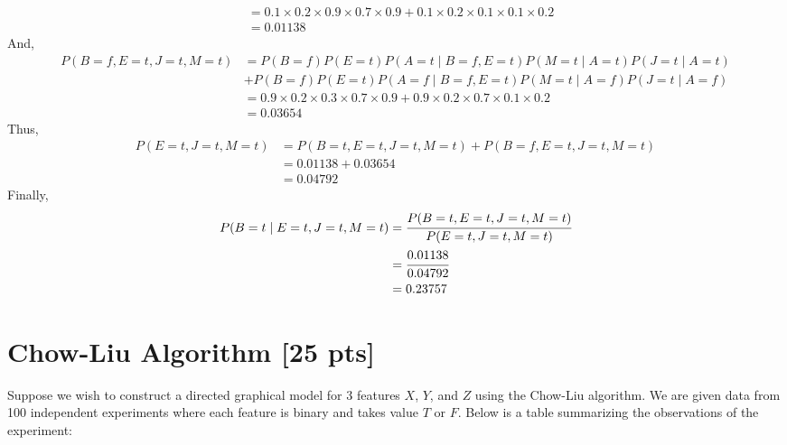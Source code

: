 \documentclass[a4paper]{article}
\theoremstyle{definition}
\newenvironment{soln}{
	\leavevmode\color{blue}\ignorespaces
}{}
\begin{document}
\begin{soln}
\begin{itemize}
\begin{align*}
		&= 0.1 \times 0.2 \times 0.9 \times 0.7 \times 0.9 + 0.1 \times 0.2 \times 0.1 \times 0.1 \times 0.2 \\
		&= 0.01138
	\end{align*}
	And,
	\begin{align*}
		P(B=f,E=t,J=t,M=t) &= P(B=f)P(E=t)P(A=t \mid B=f,E=t)P(M=t \mid A=t)P(J=t \mid A=t) \\ &+  P(B=f)P(E=t)P(A=f \mid B=f,E=t)P(M=t \mid A=f)P(J=t \mid A=f)\\
		&= 0.9 \times 0.2 \times 0.3 \times 0.7 \times 0.9 + 0.9 \times 0.2 \times 0.7 \times 0.1 \times 0.2 \\
		&= 0.03654
	\end{align*}
	Thus,
	\begin{align*}
		P(E=t,J=t,M=t) &= P(B=t,E=t,J=t,M=t) + P(B=f,E=t,J=t,M=t) \\
		&= 0.01138 + 0.03654 \\
		&= 0.04792
	\end{align*}
	Finally,
	\begin{align*}
		P(B=t \mid E=t,J=t,M=t) &= \cfrac{P(B=t,E=t,J=t,M=t)}{P(E=t,J=t,M=t)} \\
		&= \cfrac{0.01138}{0.04792} \\
		&= 0.23757
	\end{align*}
\end{itemize}

\end{soln}


\section{Chow-Liu Algorithm [25 pts]}
Suppose we wish to construct a directed graphical model for 3 features $X$, $Y$, and $Z$ using the Chow-Liu algorithm. We are given data from 100 independent experiments where each feature is binary and takes value $T$ or $F$. Below is a table summarizing the observations of the experiment:
\end{document}
